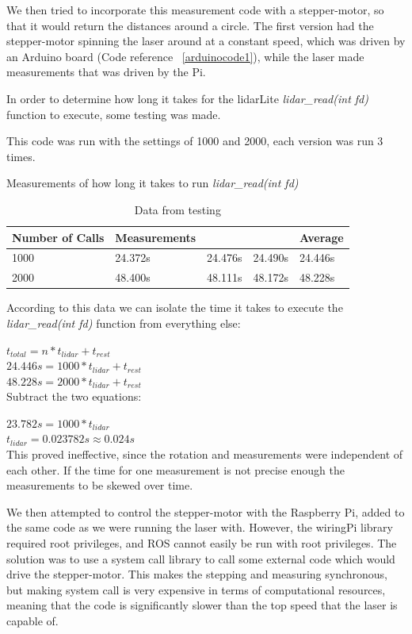 We then tried to incorporate this measurement code with a stepper-motor, so that it would return the distances around a circle. The first version had the stepper-motor spinning the laser around at a constant speed, which was driven by an Arduino board (Code reference ~\ref{arduinocode1}), while the laser made measurements that was driven by the Pi.

In order to determine how long it takes for the lidarLite \textit{lidar\_read(int fd)} function to execute, some testing was made.


This code was run with the settings of 1000 and 2000, each version was run 3 times.

Measurements of how long it takes to run \textit{lidar\_read(int fd)}

\begin{table}[H]
	\centering
	\begin{tabular}{|l|l|l|l|l|} \hline
            Number of Calls & Measurements & & & Average \\ \hline
            1000 & 24.372s & 24.476s & 24.490s & 24.446s \\ \hline
            2000 & 48.400s & 48.111s & 48.172s & 48.228s \\ \hline
	\end{tabular}
	\caption{Data from testing}
\end{table}

According to this data we can isolate the time it takes to execute the \textit{lidar\_read(int fd)} function from everything else:

$t_{total} = n*t_{lidar} + t_{rest}$ \\

$24.446s = 1000*t_{lidar} + t_{rest}$ \\
$48.228s = 2000*t_{lidar} + t_{rest}$ \\

Subtract the two equations:

$23.782s = 1000*t_{lidar}$ \\
$t_{lidar} = 0.023782s \approx 0.024s$ \\


This proved ineffective, since the rotation and measurements were independent of each other. If the time for one measurement is not precise enough the measurements to be skewed over time.

We then attempted to control the stepper-motor with the Raspberry Pi, added to the same code as we were running the laser with. However, the wiringPi library required root privileges, and ROS cannot easily be run with root privileges. The solution was to use a system call library to call some external code which would drive the stepper-motor. This makes the stepping and measuring synchronous, but making system call is very expensive in terms of computational resources, meaning that the code is significantly slower than the top speed that the laser is capable of.

